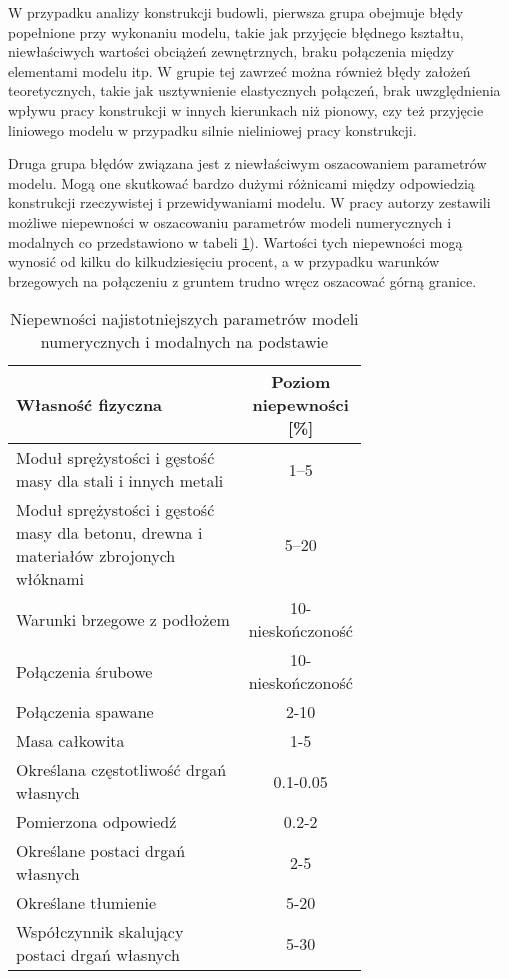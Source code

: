 W przypadku analizy konstrukcji budowli, pierwsza grupa obejmuje błędy popełnione przy wykonaniu modelu, takie jak przyjęcie błędnego kształtu, niewłaściwych wartości obciążeń zewnętrznych, braku połączenia między elementami modelu itp. W grupie tej zawrzeć można również błędy założeń teoretycznych, takie jak usztywnienie elastycznych połączeń, brak uwzględnienia wpływu pracy konstrukcji w innych kierunkach niż pionowy, czy też przyjęcie liniowego modelu w przypadku silnie nieliniowej pracy konstrukcji. 

Druga grupa błędów związana jest z niewłaściwym oszacowaniem parametrów modelu. Mogą one skutkować bardzo dużymi różnicami między odpowiedzią konstrukcji rzeczywistej i przewidywaniami modelu. W pracy \cite{Brincker2015} autorzy zestawili możliwe niepewności w oszacowaniu parametrów modeli numerycznych i modalnych co przedstawiono w tabeli \ref{table:uncertainitesModel}). Wartości tych niepewności mogą wynosić od kilku do kilkudziesięciu procent, a w przypadku warunków brzegowych na połączeniu z gruntem trudno wręcz oszacować górną granice. 

\begin{table}[hbt!]
	
	\centering
	\caption{Niepewności najistotniejszych parametrów modeli numerycznych i modalnych na podstawie \cite{Brincker2015}}
	\footnotesize
		\begin{tabular}{@{}p{0.7\linewidth}  c @{}}
			\toprule 
			Własność fizyczna   & Poziom niepewności [\%] \\
			\midrule
			Moduł sprężystości i gęstość masy dla stali i innych metali  &    1--5    \\
			Moduł sprężystości i gęstość masy dla betonu, drewna i materiałów zbrojonych włóknami & 5--20\\
			Warunki brzegowe z podłożem &    10-nieskończoność     \\
			Połączenia śrubowe & 10-nieskończoność\\
			Połączenia spawane & 2-10\\
			Masa całkowita & 1-5 \\
			Określana częstotliwość drgań własnych & 0.1-0.05\\
			Pomierzona odpowiedź & 0.2-2\\
			Określane postaci drgań własnych & 2-5\\ 
			Określane tłumienie & 5-20\\
			Współczynnik skalujący postaci drgań własnych & 5-30\\
			\bottomrule
	\end{tabular}
	\label{table:uncertainitesModel}
\end{table}

